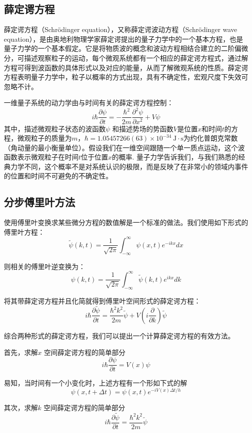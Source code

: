\documentclass[UTF8,ctexart,a4paper,11pt,openany]{article}
\theoremstyle{definition}
\begin{document}
\subsection{薛定谔方程}
薛定谔方程（Schrödinger equation），又称薛定谔波动方程（Schrödinger wave equation），是由奥地利物理学家薛定谔提出的量子力学中的一个基本方程，也是量子力学的一个基本假定。它是将物质波的概念和波动方程相结合建立的二阶偏微分，可描述观察粒子的运动，每个微观系统都有一个相应的薛定谔方程式，通过解方程可得到波函数的具体形式以及对应的能量，从而了解微观系统的性质。薛定谔方程表明量子力学中，粒子以概率的方式出现，具有不确定性，宏观尺度下失效可忽略不计。\par
一维量子系统的动力学由与时间有关的薛定谔方程控制：$$i \hbar \frac{\partial \psi}{\partial t}=-\frac{\hbar^{2}}{2 m} \frac{\partial^{2} \psi}{\partial x^{2}}+V \psi$$其中，描述微观粒子状态的波函数$\psi$ 
和描述势场的势函数$V$是位置$x$和时间$t$的方程，微观粒子的质量为$m$，$\hbar=1.05457266(63) \times 10^{-34} \mathrm{~J} \cdot \mathrm{s}$为约化普朗克常数（角动量的最小衡量单位）。假设我们在一维空间跟随一个单一质点运动，这个波函数表示微观粒子在时间$t $位于位置$x$的概率. 量子力学告诉我们，与我们熟悉的经典力学不同，这个概率不是对系统认识的极限，而是反映了在非常小的领域内事件的位置和时间不可避免的不确定性。
\subsection{分步傅里叶方法}
使用傅里叶变换求某些微分方程的数值解是一个标准的做法。我们使用如下形式的傅里叶方程：
$$\widetilde{\psi}(k, t)=\frac{1}{\sqrt{2 \pi}} \int_{-\infty}^{\infty} \psi(x, t) e^{-i k x} d x$$

则相关的傅里叶逆变换为：
$$\psi(k, t)=\frac{1}{\sqrt{2 \pi}} \int_{-\infty}^{\infty} \widetilde{\psi}(k, t) e^{i k x} d k$$

将其带薛定谔方程并且化简就得到傅里叶空间形式的薛定谔方程：
$$i \hbar \frac{\partial \widetilde{\psi}}{\partial t}=\frac{\hbar^{2} k^{2}}{2 m} \widetilde{\psi}+V\left(i \frac{\partial}{\partial k}\right) \widetilde{\psi}$$

综合两种形式的薛定谔方程，我们可以提出一个计算薛定谔方程的有效方法。

首先，求解$x $ 
 空间薛定谔方程的简单部分
 $$i \hbar \frac{\partial \psi}{\partial t}=V(x) \psi$$

易知，当时间有一个小变化时，上述方程有一个形如下式的解
$$\psi(x, t+\Delta t)=\psi(x, t) e^{-i V(x) \Delta t / h}$$

其次，求解$k$
 空间薛定谔方程的简单部分
$$i \hbar \frac{\partial \widetilde{\psi}}{\partial t}=\frac{\hbar^{2} k^{2}}{2 m} \widetilde{\psi}$$
\end{document}
